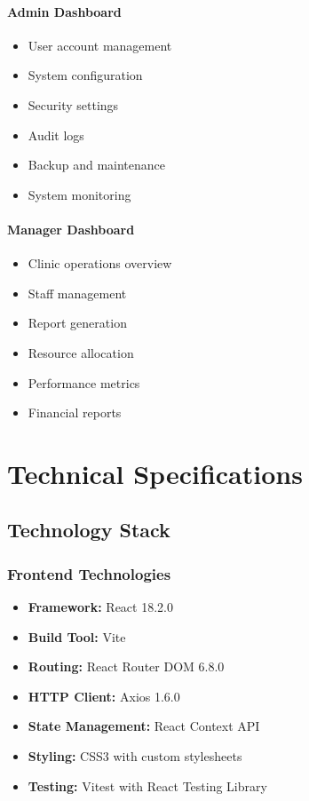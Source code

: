 \documentclass[12pt,a4paper]{article}
\begin{document}
\paragraph{Admin Dashboard}
\begin{itemize}
    \item User account management
    \item System configuration
    \item Security settings
    \item Audit logs
    \item Backup and maintenance
    \item System monitoring
\end{itemize}

\paragraph{Manager Dashboard}
\begin{itemize}
    \item Clinic operations overview
    \item Staff management
    \item Report generation
    \item Resource allocation
    \item Performance metrics
    \item Financial reports
\end{itemize}

\section{Technical Specifications}

\subsection{Technology Stack}

\subsubsection{Frontend Technologies}
\begin{itemize}
    \item \textbf{Framework:} React 18.2.0
    \item \textbf{Build Tool:} Vite
    \item \textbf{Routing:} React Router DOM 6.8.0
    \item \textbf{HTTP Client:} Axios 1.6.0
    \item \textbf{State Management:} React Context API
    \item \textbf{Styling:} CSS3 with custom stylesheets
    \item \textbf{Testing:} Vitest with React Testing Library
\end{itemize}
\end{document}
